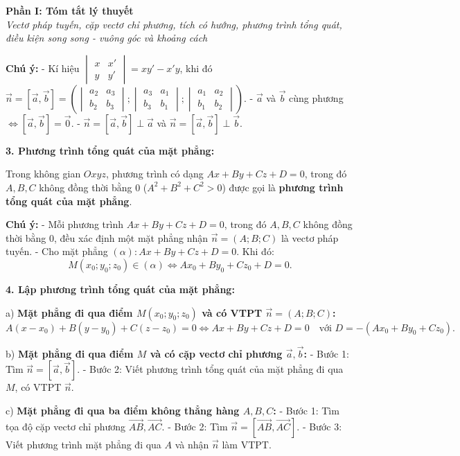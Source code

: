 \documentclass[12pt,a4paper]{article}
\newenvironment{lesson}[2]{
	\vspace{1em}\noindent\textbf{\Large #1}\\
	\textit{#2}\vspace{0.5em}
}{}
\begin{document}
\begin{lesson}{Phần I: Tóm tắt lý thuyết}{Vectơ pháp tuyến, cặp vectơ chỉ phương, tích có hướng, phương trình tổng quát, điều kiện song song - vuông góc và khoảng cách}
\textbf{Chú ý:}
- Kí hiệu $\begin{vmatrix} x & x' \\ y & y' \end{vmatrix} = x y' - x' y$, khi đó $\vec{n} = [\vec{a}, \vec{b}] = \left( \begin{vmatrix} a_2 & a_3 \\ b_2 & b_3 \end{vmatrix}; \begin{vmatrix} a_3 & a_1 \\ b_3 & b_1 \end{vmatrix}; \begin{vmatrix} a_1 & a_2 \\ b_1 & b_2 \end{vmatrix} \right)$.
- $\vec{a}$ và $\vec{b}$ cùng phương $\Leftrightarrow [\vec{a}, \vec{b}] = \vec{0}$.
- $\vec{n} = [\vec{a}, \vec{b}] \perp \vec{a}$ và $\vec{n} = [\vec{a}, \vec{b}] \perp \vec{b}$.

\textbf{3. Phương trình tổng quát của mặt phẳng:}

Trong không gian $Oxyz$, phương trình có dạng $Ax + By + Cz + D = 0$, trong đó $A, B, C$ không đồng thời bằng $0$ ($A^2 + B^2 + C^2 > 0$) được gọi là \textbf{phương trình tổng quát của mặt phẳng}.

\textbf{Chú ý:}
- Mỗi phương trình $Ax + By + Cz + D = 0$, trong đó $A, B, C$ không đồng thời bằng $0$, đều xác định một mặt phẳng nhận $\vec{n} = (A; B; C)$ là vectơ pháp tuyến.
- Cho mặt phẳng $(\alpha): Ax + By + Cz + D = 0$. Khi đó:
$$M(x_0; y_0; z_0) \in (\alpha) \Leftrightarrow A x_0 + B y_0 + C z_0 + D = 0.$$

\textbf{4. Lập phương trình tổng quát của mặt phẳng:}

a) \textbf{Mặt phẳng đi qua điểm $M(x_0; y_0; z_0)$ và có VTPT $\vec{n} = (A; B; C)$:}
$$A(x - x_0) + B(y - y_0) + C(z - z_0) = 0 \Leftrightarrow Ax + By + Cz + D = 0 \quad \text{với } D = -(A x_0 + B y_0 + C z_0).$$

b) \textbf{Mặt phẳng đi qua điểm $M$ và có cặp vectơ chỉ phương $\vec{a}, \vec{b}$:}
- Bước 1: Tìm $\vec{n} = [\vec{a}, \vec{b}]$.
- Bước 2: Viết phương trình tổng quát của mặt phẳng đi qua $M$, có VTPT $\vec{n}$.

c) \textbf{Mặt phẳng đi qua ba điểm không thẳng hàng $A, B, C$:}
- Bước 1: Tìm tọa độ cặp vectơ chỉ phương $\vec{AB}, \vec{AC}$.
- Bước 2: Tìm $\vec{n} = [\vec{AB}, \vec{AC}]$.
- Bước 3: Viết phương trình mặt phẳng đi qua $A$ và nhận $\vec{n}$ làm VTPT.


\end{lesson}
\end{document}
